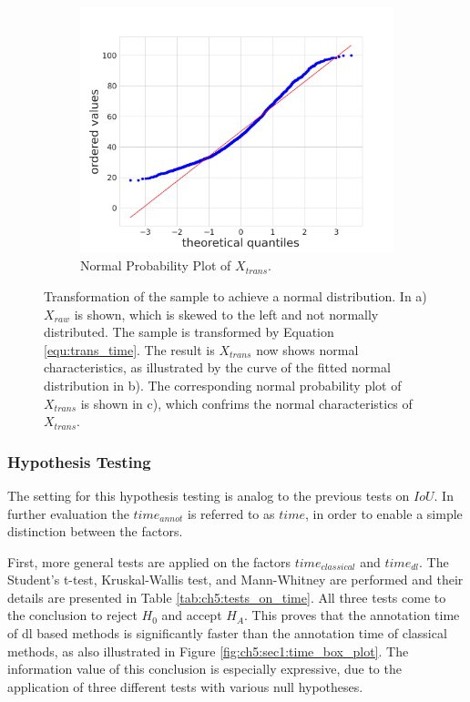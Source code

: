 \begin{figure} [h]
\begin{subfigure}[t]{0.3\textwidth}
	\end{subfigure}
	\hfill
	\begin{subfigure}[t]{0.3\textwidth}
		\centering
		\includegraphics[width=\textwidth]{figures/chap51_time_probplot.png}
		\caption{
			Normal Probability Plot of $X_{trans}$.
		}\label{fig:ch5:sec1:time_probplot}
	\end{subfigure}
	\caption[Sample Transformation $ time $]{
		Transformation of the sample to achieve a normal distribution.
		In a) $X_{raw}$ is shown, which is skewed to the left and not normally distributed.
		The sample is transformed by Equation \ref{equ:trans_time}.
		The result is $X_{trans}$ now shows normal characteristics, as illustrated by the curve of the fitted normal distribution in b).
		The corresponding normal probability plot of $X_{trans}$ is shown in c), which confrims the normal characteristics of $X_{trans}$.
	}\label{fig:ch5:sec1:time_transformation_iou}
\end{figure}




\subsubsection{Hypothesis Testing}

The setting for this hypothesis testing is analog to the previous tests on $IoU$.
In further evaluation the $time_{annot}$ is referred to as $time$, in order to enable a simple distinction between the factors.

First, more general tests are applied on the factors $time_{classical}$ and $time_{dl}$.
The Student's t-test, Kruskal-Wallis test, and Mann-Whitney are performed and their details are presented in Table \ref{tab:ch5:tests_on_time}.
All three tests come to the conclusion to reject $H_{0}$ and accept $H_{A}$.
This proves that the annotation time of \gls{dl} based methods is significantly faster than the annotation time of classical methods, as also illustrated in Figure \ref{fig:ch5:sec1:time_box_plot}.
The information value of this conclusion is especially expressive, due to the application of three different tests with various null hypotheses.


